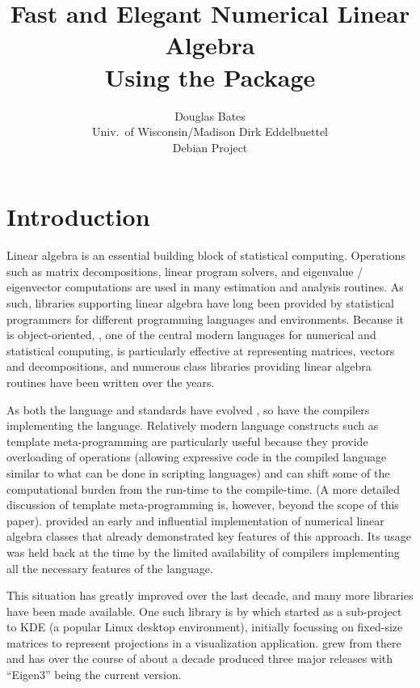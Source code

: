 \documentclass[shortnames,article,nojss]{jss}
\author{Douglas Bates\\Univ.~of Wisconsin/Madison \And Dirk Eddelbuettel\\Debian Project} %
\title{Fast and Elegant Numerical Linear Algebra\\ Using the \pkg{RcppEigen} Package}
\begin{document}

\section{Introduction}
\label{sec:intro}

Linear algebra is an essential building block of statistical
computing.  Operations such as matrix decompositions, linear program
solvers, and eigenvalue / eigenvector computations are used in many
estimation and analysis routines. As such, libraries supporting linear
algebra have long been provided by statistical programmers for
different programming languages and environments.  Because it is
object-oriented, , one of the central modern languages
for numerical and statistical computing, is particularly effective at
representing matrices, vectors and decompositions, and numerous class
libraries providing linear algebra routines have been written over the
years.

As both the  language and standards have evolved
\citep{Meyers:2005:EffectiveC++,Meyers:1995:MoreEffectiveC++,cpp11},
so have the compilers implementing the language.  Relatively modern
language constructs such as template meta-programming are particularly
useful because they provide overloading of operations (allowing
expressive code in the compiled language similar to what can be done
in scripting languages) and can shift some of the computational burden
from the run-time to the compile-time. (A more detailed discussion of
template meta-programming is, however, beyond the scope of this
paper). \cite{Veldhuizen:1998:Blitz} provided an early and influential
implementation of numerical linear algebra classes that already
demonstrated key features of this approach.  Its usage was held back
at the time by the limited availability of compilers implementing all the
necessary features of the  language.

This situation has greatly improved over the last decade, and many more
libraries have been made available. One such  library is
 by \citet*{Eigen:Web} which started as a sub-project to
KDE (a popular Linux desktop environment), initially focussing on fixed-size
matrices to represent projections in a visualization application. 
grew from there and has over the course of about a decade produced three
major releases with ``Eigen3'' being the current version.
\end{document}
